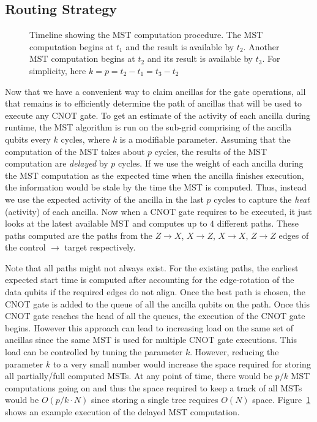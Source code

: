 \subsection{Routing Strategy}\label{section:efficientmst}
\begin{figure}
    \centering
    
    \caption{Timeline showing the MST computation procedure. The MST computation begins at $t_1$ and the result is available by $t_2$. Another MST computation begins at $t_2$ and its result is available by $t_3$. For simplicity, here $k = p = t_2 - t_1 = t_3 - t_2$}
    \label{fig:mst_selection}
\end{figure}
Now that we have a convenient way to claim ancillas for the gate operations, all that remains is to efficiently determine the path of ancillas that will be used to execute any CNOT gate. To get an estimate of the activity of each ancilla during runtime, the MST algorithm is run on the sub-grid comprising of the ancilla qubits every $k$ cycles, where $k$ is a modifiable parameter. Assuming that the computation of the MST takes about $p$ cycles, the results of the MST computation are \textit{delayed} by $p$ cycles. If we use the weight of each ancilla during the MST computation as the expected time when the ancilla finishes execution, the information would be stale by the time the MST is computed. Thus, instead we use the expected activity of the ancilla in the last $p$ cycles to capture the \textit{heat} (activity) of each ancilla. Now when a CNOT gate requires to be executed, it just looks at the latest available MST and computes up to $4$ different paths. These paths computed are the paths from the $Z\to X$, $X\to Z$, $X\to X$, $Z\to Z$ edges of the control $\to$ target respectively.\par
Note that all paths might not always exist. For the existing paths, the earliest expected start time is computed after accounting for the edge-rotation of the data qubits if the required edges do not align. %
Once the best path is chosen, the CNOT gate is added to the queue of all the ancilla qubits on the path. Once this CNOT gate reaches the head of all the queues, the execution of the CNOT gate begins. However this approach can lead to increasing load on the same set of ancillas since the same MST is used for multiple CNOT gate executions. This load can be controlled by tuning the parameter $k$. However, reducing the parameter $k$ to a very small number would increase the space required for storing all partially/full computed MSTs. At any point of time, there would be $p/k$ MST computations going on and thus the space required to keep a track of all MSTs would be $O(p/k\cdot N)$ since storing a single tree requires $O(N)$ space. Figure~\ref{fig:mst_selection} shows an example execution of the delayed MST computation.

